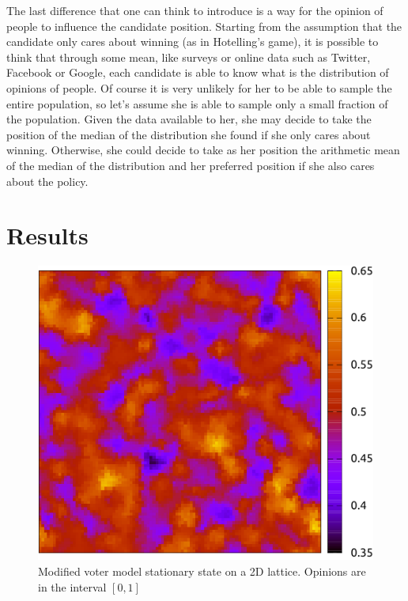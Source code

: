 \documentclass[11pt,a4paper,twocolumn]{article}
\begin{document}
The last difference that one can think to introduce is a way for the opinion of people to influence the candidate position.
Starting from the assumption that the candidate only cares about winning (as in Hotelling's game), it is possible to think that through some mean, like surveys or online data such as Twitter, Facebook or Google, each candidate is able to know what is the distribution of opinions of people. Of course it is very unlikely for her to be able to sample the entire population, so let's assume she is able to sample only a small fraction of the population. Given the data available to her, she may decide to take the position of the median of the distribution she found if she only cares about winning. Otherwise, she could decide to take as her position the arithmetic mean of the median of the distribution and her preferred position if she also cares about the policy.

\section*{Results}
\begin{figure}
\includegraphics[scale=1]{pictures/voter_mod-crop.pdf}
\caption{Modified voter model stationary state on a 2D lattice. Opinions are in the interval $[0,1]$}
\label{fig:voter.mod}
\end{figure}
\end{document}

